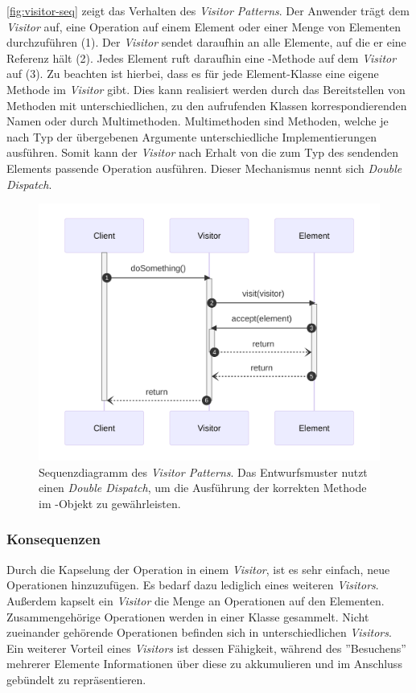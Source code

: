 \autoref{fig:visitor-seq} zeigt das Verhalten des \emph{Visitor Patterns}. Der Anwender trägt dem \emph{Visitor} auf, eine Operation auf einem Element oder einer Menge von Elementen durchzuführen (1). Der \emph{Visitor} sendet daraufhin  an alle Elemente, auf die er eine Referenz hält (2). Jedes Element ruft daraufhin eine -Methode auf dem \emph{Visitor} auf (3). Zu beachten ist hierbei, dass es für jede Element-Klasse eine eigene Methode im \emph{Visitor} gibt. Dies kann realisiert werden durch das Bereitstellen von Methoden mit unterschiedlichen, zu den aufrufenden Klassen korrespondierenden Namen oder durch Multimethoden. Multimethoden sind Methoden, welche je nach Typ der übergebenen Argumente unterschiedliche Implementierungen ausführen. Somit kann der \emph{Visitor} nach Erhalt von  die zum Typ des sendenden Elements passende Operation ausführen. Dieser Mechanismus nennt sich \emph{Double Dispatch}.

\begin{figure}[!ht]
	\centering
	\includegraphics[width=0.75\linewidth]{images/patterns/visitor-seq.png}
	\caption{Sequenzdiagramm des \emph{Visitor Patterns}. Das Entwurfsmuster nutzt einen \emph{Double Dispatch}, um die Ausführung der korrekten Methode im -Objekt zu gewährleisten. \cite{skobeleva_visitor_2023}}
	\label{fig:visitor-seq}
\end{figure}

\subsubsection*{Konsequenzen}
Durch die Kapselung der Operation in einem \emph{Visitor}, ist es sehr einfach, neue Operationen hinzuzufügen. Es bedarf dazu lediglich eines weiteren \emph{Visitors}. Außerdem kapselt ein \emph{Visitor} die Menge an Operationen auf den Elementen. Zusammengehörige Operationen werden in einer Klasse gesammelt. Nicht zueinander gehörende Operationen befinden sich in unterschiedlichen \emph{Visitors}. Ein weiterer Vorteil eines \emph{Visitors} ist dessen Fähigkeit, während des ''Besuchens'' mehrerer Elemente Informationen über diese zu akkumulieren und im Anschluss gebündelt zu repräsentieren.

